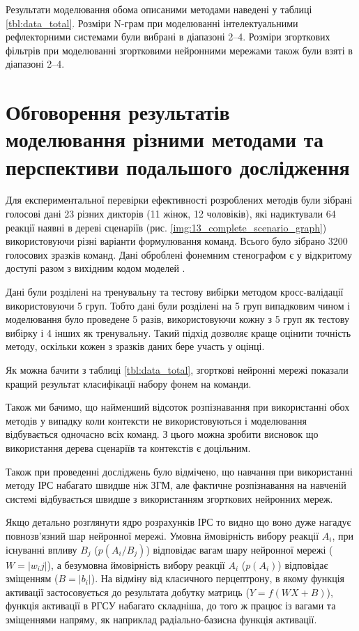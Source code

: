 Результати моделювання обома описаними методами наведені у таблиці \ref{tbl:data_total}. Розміри N-грам при моделюванні інтелектуальними рефлекторними системами були вибрані в діапазоні 2--4. Розміри згорткових фільтрів при моделюванні згортковими нейронними мережами також були взяті в діапазоні 2--4.

\section{Обговорення результатів моделювання різними методами та перспективи подальшого дослідження}

Для експериментальної перевірки ефективності розроблених методів були зібрані голосові дані 23 різних дикторів (11 жінок, 12 чоловіків), які надиктували 64 реакції наявні в дереві сценаріїв (рис. \ref{img:13_complete_scenario_graph}) використовуючи різні варіанти формулювання команд. Всього було зібрано 3200 голосових зразків команд. Дані оброблені фонемним стенографом є у відкритому доступі разом з вихідним кодом моделей \cite{code1,code2}.

Дані були розділені на тренувальну та тестову вибірки методом кросс-валідації використовуючи 5 груп. Тобто дані були розділені на 5 груп випадковим чином і моделювання було проведене 5 разів, використовуючи кожну з 5 груп як тестову вибірку і 4 інших як тренувальну. Такий підхід дозволяє краще оцінити точність методу, оскільки кожен з зразків даних бере участь у оцінці.

Як можна бачити з таблиці \ref{tbl:data_total}, згорткові нейронні мережі показали кращий результат класифікації набору фонем на команди. 

Також ми бачимо, що найменший відсоток розпізнавання при використанні обох методів у випадку коли контексти не використовуються і моделювання відбувається одночасно всіх команд. З цього можна зробити висновок що використання дерева сценаріїв та контекстів є доцільним.

Також при проведенні досліджень було відмічено, що навчання при використанні методу ІРС набагато швидше ніж ЗГМ, але фактичне розпізнавання на навченій системі відбувається швидше з використанням згорткових нейронних мереж.

Якщо детально розглянути ядро розрахунків ІРС то видно що воно дуже нагадує повнозв'язний шар нейронної мережі. Умовна ймовірність вибору реакції $A_i$, при існуванні впливу $B_j$ ($p(A_i/B_j)$) відповідає вагам шару нейронної мережі ($W = |w_ij|$), а безумовна ймовірність вибору реакції $A_i$ ($p(A_i)$) відповідає зміщенням ($B = |b_i|$). На відміну від класичного перцептрону, в якому функція активації застосовується до результата добутку матриць ($Y=f(WX + B)$), функція активації в РГСУ набагато складніша, до того ж працює із вагами та зміщеннями напряму, як наприклад радіально-базисна функція активації.

